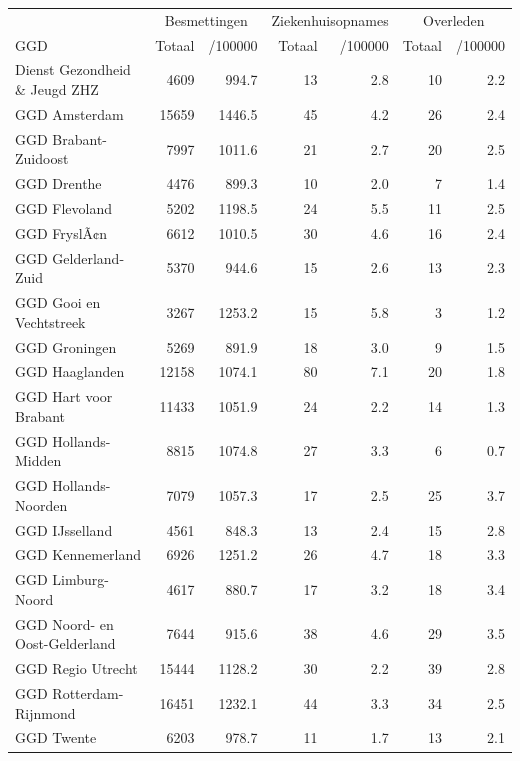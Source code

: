 \documentclass[
  english,
  man,floatsintext]{apa6}
\begin{document}
\begin{table}
\centering\begingroup\fontsize{10}{12}\selectfont

\begin{threeparttable}
\begin{tabular}{lrrrrrr}
\toprule
\multicolumn{1}{c}{ } & \multicolumn{2}{c}{Besmettingen} & \multicolumn{2}{c}{Ziekenhuisopnames} & \multicolumn{2}{c}{Overleden} \\
\cmidrule(l{3pt}r{3pt}){2-3} \cmidrule(l{3pt}r{3pt}){4-5} \cmidrule(l{3pt}r{3pt}){6-7}
GGD & Totaal & /100000 & Totaal & /100000 & Totaal & /100000\\
\midrule
Dienst Gezondheid \& Jeugd ZHZ & 4609 & 994.7 & 13 & 2.8 & 10 & 2.2\\
GGD Amsterdam & 15659 & 1446.5 & 45 & 4.2 & 26 & 2.4\\
GGD Brabant-Zuidoost & 7997 & 1011.6 & 21 & 2.7 & 20 & 2.5\\
GGD Drenthe & 4476 & 899.3 & 10 & 2.0 & 7 & 1.4\\
GGD Flevoland & 5202 & 1198.5 & 24 & 5.5 & 11 & 2.5\\
GGD FryslÃ¢n & 6612 & 1010.5 & 30 & 4.6 & 16 & 2.4\\
GGD Gelderland-Zuid & 5370 & 944.6 & 15 & 2.6 & 13 & 2.3\\
GGD Gooi en Vechtstreek & 3267 & 1253.2 & 15 & 5.8 & 3 & 1.2\\
GGD Groningen & 5269 & 891.9 & 18 & 3.0 & 9 & 1.5\\
GGD Haaglanden & 12158 & 1074.1 & 80 & 7.1 & 20 & 1.8\\
GGD Hart voor Brabant & 11433 & 1051.9 & 24 & 2.2 & 14 & 1.3\\
GGD Hollands-Midden & 8815 & 1074.8 & 27 & 3.3 & 6 & 0.7\\
GGD Hollands-Noorden & 7079 & 1057.3 & 17 & 2.5 & 25 & 3.7\\
GGD IJsselland & 4561 & 848.3 & 13 & 2.4 & 15 & 2.8\\
GGD Kennemerland & 6926 & 1251.2 & 26 & 4.7 & 18 & 3.3\\
GGD Limburg-Noord & 4617 & 880.7 & 17 & 3.2 & 18 & 3.4\\
GGD Noord- en Oost-Gelderland & 7644 & 915.6 & 38 & 4.6 & 29 & 3.5\\
GGD Regio Utrecht & 15444 & 1128.2 & 30 & 2.2 & 39 & 2.8\\
GGD Rotterdam-Rijnmond & 16451 & 1232.1 & 44 & 3.3 & 34 & 2.5\\
GGD Twente & 6203 & 978.7 & 11 & 1.7 & 13 & 2.1\\

\end{tabular}
\end{threeparttable}
\end{table}
\end{document}
